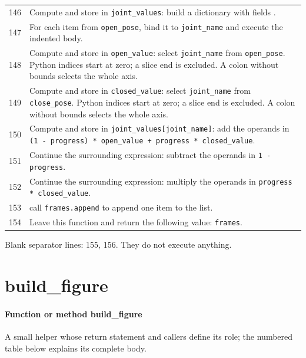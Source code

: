 \documentclass[11pt,a4paper]{book}
\begin{document}
\begin{longtable}{r p{}}
146 & Compute and store in \texttt{joint\_values}: build a dictionary with fields \texttt{}.  \\

147 & For each item from \texttt{open\_pose}, bind it to \texttt{joint\_name} and execute the indented body. \\

148 & Compute and store in \texttt{open\_value}: select \texttt{joint\_name} from \texttt{open\_pose}. Python indices start at zero; a slice end is excluded. A colon without bounds selects the whole axis.  \\

149 & Compute and store in \texttt{closed\_value}: select \texttt{joint\_name} from \texttt{close\_pose}. Python indices start at zero; a slice end is excluded. A colon without bounds selects the whole axis.  \\

150 & Compute and store in \texttt{joint\_values[joint\_name]}: add the operands in \texttt{(1 - progress) * open\_value + progress * closed\_value}.  \\

151 & Continue the surrounding expression: subtract the operands in \texttt{1 - progress}. \\

152 & Continue the surrounding expression: multiply the operands in \texttt{progress * closed\_value}. \\

153 & call \texttt{frames.append} to append one item to the list. \\

154 & Leave this function and return the following value: \texttt{frames}. \\

\end{longtable}

Blank separator lines: 155, 156. They do not execute anything.

\section{build\_figure}

\paragraph{Function or method build\_figure}
A small helper whose return statement and callers define its role; the numbered table below explains its complete body.
\end{document}
